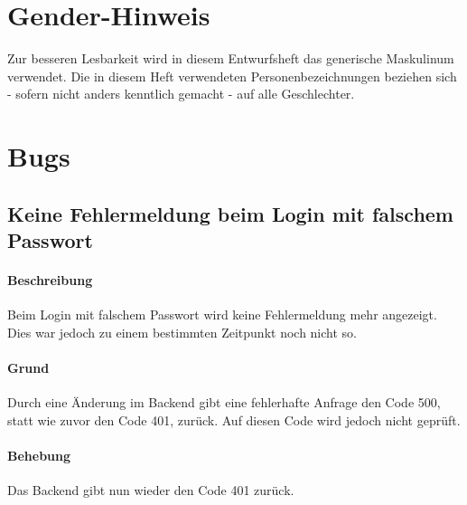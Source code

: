 \documentclass{qualitätssicherungsheft}
\begin{document}

\maketitle
\tableofcontents
\newpage

\section*{Gender-Hinweis}
Zur besseren Lesbarkeit wird in diesem Entwurfsheft das generische Maskulinum verwendet.
Die in diesem Heft verwendeten Personenbezeichnungen beziehen sich - sofern nicht anders kenntlich gemacht - auf alle Geschlechter.
\newpage
\section{Bugs}
\subsection{Keine Fehlermeldung beim Login mit falschem Passwort}
\paragraph*{Beschreibung} Beim Login mit falschem Passwort wird keine Fehlermeldung mehr angezeigt. Dies war jedoch zu einem bestimmten Zeitpunkt noch nicht so.
\paragraph{Grund} Durch eine Änderung im Backend 
gibt eine fehlerhafte Anfrage den Code 500, statt wie zuvor den Code 401, zurück. Auf diesen Code wird jedoch nicht geprüft.
\paragraph{Behebung} Das Backend gibt nun wieder den Code 401 zurück.
\end{document}
